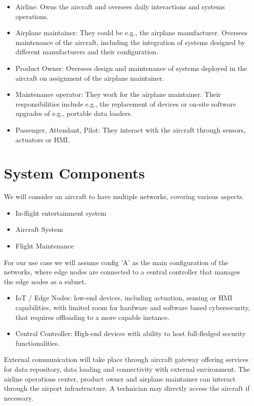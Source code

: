 \begin{itemize}
	\item Airline:
	      Owns the aircraft and oversees daily interactions and systems operations.
	\item Airplane maintainer: They could be e.g., the airplane manufacturer. Oversees maintenance of the aircraft,
	      including the integration of systems designed by different manufacturers and their configuration.
	\item Product Owner: Oversees design and maintenance of systems deployed in the aircraft on assignment of the
	      airplane maintainer.
	\item Maintenance operator: They work for the airplane maintainer. Their responsibilities include e.g.,
	      the replacement of devices or on-site software upgrades of e.g., portable data loaders.
	\item Passenger, Attendant, Pilot: They interact with the aircraft through sensors, actuators or HMI.
\end{itemize}

\section{System Components}

We will consider an aircraft to have multiple networks, covering various aspects.
\begin{itemize}
	\item In-flight entertainment system
	\item Aircraft System
	\item Flight Maintenance
\end{itemize}

For our use case we will assume config 'A' as the main configuration of the networks, where edge nodes are connected to
a central controller that manages the edge nodes as a subnet.
\begin{itemize}
	\item IoT / Edge Nodes: low-end devices, including actuation, sensing or HMI capabilities, with limited
	      room for hardware and software based cybersecurity, that requires offloading to a more capable
	      instance.
	\item Central Controller: High-end devices with ability to host full-fledged security functionalities.
\end{itemize}

External communication will take place through aircraft gateway offering services for data repository, data loading and
connectivity with external environment. The airline operations center, product owner and airplane maintainer can interact
through the airport infrastructure. A technician may directly access the aircraft if necessary.


